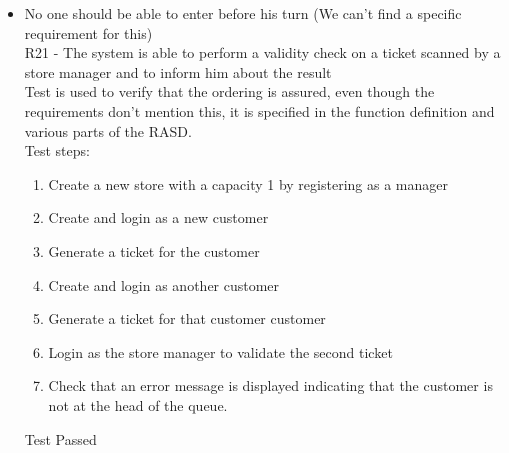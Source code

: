 \begin{itemize}
    \item No one should be able to enter before his turn (We can't find a specific requirement for this) \\
    R21 - The system is able to perform a validity check on a ticket scanned by a store manager and to inform him about the result \\
    Test is used to verify that the ordering is assured, even though the requirements don't mention this, it is specified in the function definition and various parts of the RASD.\\
    Test steps:
    \begin{enumerate}
        \item Create a new store with a capacity 1 by registering as a manager
        \item Create and login as a new customer
        \item Generate a ticket for the customer
        \item Create and login as another customer
        \item Generate a ticket for that customer customer
        \item Login as the store manager to validate the second ticket
        \item Check that an error message is displayed indicating that the customer is not at the head of the queue.
    \end{enumerate}
    Test Passed\\
\end{itemize}
